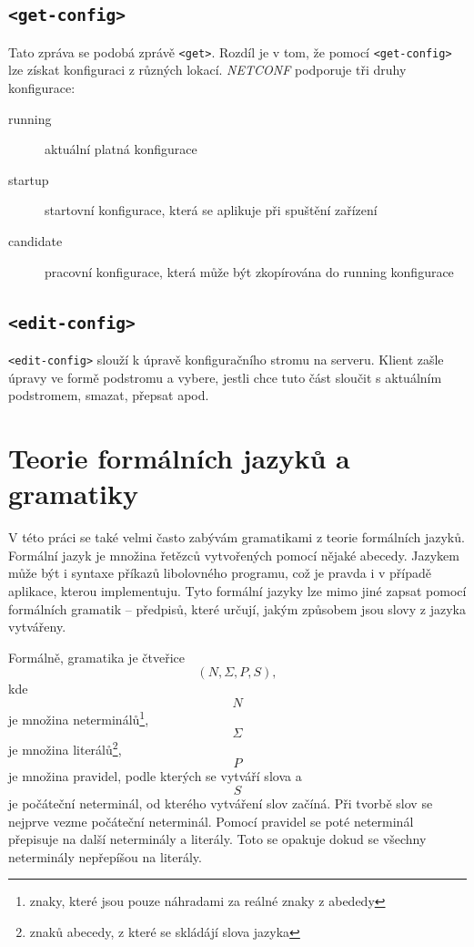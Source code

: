 \documentclass[thesis=B,czech,hidelinks]{FITthesis}[2019/03/06]
\begin{document}
\subsection{\texttt{<get-config>}}
Tato zpráva se podobá zprávě \texttt{<get>}. Rozdíl je v tom, že pomocí \texttt{<get-config>} lze získat konfiguraci z různých lokací. \textit{NETCONF} podporuje tři druhy konfigurace:
\begin{description}
    \item[running]{aktuální platná konfigurace}
    \item[startup]{startovní konfigurace, která se aplikuje při spuštění zařízení}
    \item[candidate]{pracovní konfigurace, která může být zkopírována do running konfigurace}
\end{description}

\subsection{\texttt{<edit-config>}}
\texttt{<edit-config>} slouží k úpravě konfiguračního stromu na serveru. Klient zašle úpravy ve formě podstromu a vybere, jestli chce tuto část sloučit s aktuálním podstromem, smazat, přepsat apod.

\section{Teorie formálních jazyků a gramatiky}
V této práci se také velmi často zabývám gramatikami z teorie formálních jazyků. Formální jazyk je množina řetězců vytvořených pomocí nějaké abecedy. Jazykem může být i syntaxe příkazů libolovného programu, což je pravda i v případě aplikace, kterou implementuju. Tyto formální jazyky lze mimo jiné zapsat pomocí formálních gramatik -- předpisů, které určují, jakým způsobem jsou slovy z jazyka vytvářeny.\,\cite{formal-languages}

Formálně, gramatika je čtveřice \[(N, \Sigma, P, S),\] kde \[N\] je množina neterminálů\footnote{znaky, které jsou pouze náhradami za reálné znaky z abededy}, \[\Sigma\] je množina literálů\footnote{znaků abecedy, z které se skládájí slova jazyka}, \[P\] je množina pravidel, podle kterých se vytváří slova a \[S\] je počáteční neterminál, od kterého vytváření slov začíná. Při tvorbě slov se nejprve vezme počáteční neterminál. Pomocí pravidel se poté neterminál přepisuje na další neterminály a literály. Toto se opakuje dokud se všechny neterminály nepřepíšou na literály.
\end{document}
